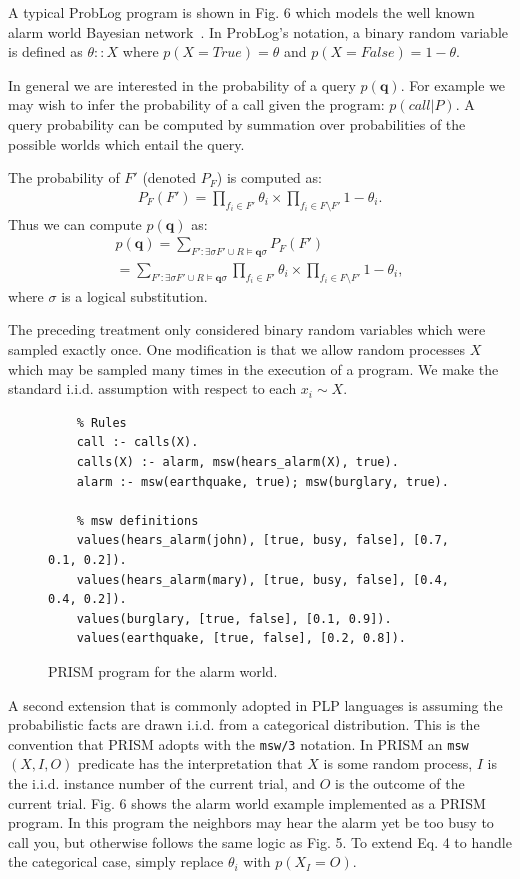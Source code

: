\documentclass[11pt]{article}
\begin{document}
A typical ProbLog program is shown in Fig. 6 which models the well known alarm world Bayesian network~\cite{DeRaedt:2015:PPC:2812521.2812529}.  In ProbLog's notation, a binary random variable is defined as $\theta::X$ where $p(X = True) = \theta$ and $p(X = False) = 1 - \theta$.

In general we are interested in the probability of a query $p(\mathbf{q})$.  For example we may wish to infer the probability of a call given the program: $p(call| P)$.  A query probability can be computed by summation over probabilities of the possible worlds which entail the query.  

The probability of $F'$ (denoted $P_F$) is computed as:
\begin{gather}
P_F(F') = \prod_{f_i \in F'} \theta_i \times \prod_{f_i \in F \setminus F'} 1 - \theta_i.
\end{gather} 
Thus we can compute $p(\mathbf{q})$ as:
\begin{equation}
\begin{gathered}
p(\mathbf{q}) = \sum_{F' : \exists \sigma F' \cup R \models \mathbf{q}\sigma} P_F(F')\\
= \sum_{F':\exists \sigma F' \cup R \models \mathbf{q}\sigma} \prod_{f_i \in F'} \theta_i \times \prod_{f_i \in F \setminus F'} 1 - \theta_i,
\end{gathered}
\end{equation}
where $\sigma$ is a logical substitution.

The preceding treatment only considered binary random variables which were sampled exactly once.  One modification is that we allow random processes $X$ which may be sampled many times in the execution of a program.  We make the standard i.i.d. assumption with respect to each $x_i \sim X$.  

\begin{figure}
	\begin{verbatim}
	% Rules
	call :- calls(X).
	calls(X) :- alarm, msw(hears_alarm(X), true).
	alarm :- msw(earthquake, true); msw(burglary, true).
	
	% msw definitions
	values(hears_alarm(john), [true, busy, false], [0.7, 0.1, 0.2]).
	values(hears_alarm(mary), [true, busy, false], [0.4, 0.4, 0.2]).
	values(burglary, [true, false], [0.1, 0.9]).
	values(earthquake, [true, false], [0.2, 0.8]).
	\end{verbatim}
	\caption{PRISM program for the alarm world.}
\end{figure}

A second extension that is commonly adopted in PLP languages is assuming the probabilistic facts are drawn i.i.d. from a categorical distribution.  This is the convention that PRISM adopts with the \verb!msw/3! notation.  In PRISM an \verb!msw!$(X, I, O)$ predicate has the interpretation that $X$ is some random process, $I$ is the i.i.d. instance number of the current trial, and $O$ is the outcome of the current trial.  Fig. 6 shows the alarm world example implemented as a PRISM program.  In this program the neighbors may hear the alarm yet be too busy to call you, but otherwise follows the same logic as Fig. 5.  To extend Eq. 4 to handle the categorical case, simply replace $\theta_i$ with $p(X_I = O)$.
\end{document}
